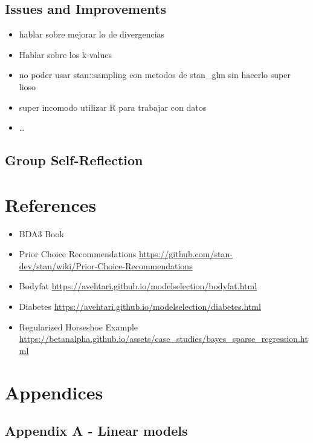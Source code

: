 \documentclass[
]{article}
\providecommand{\tightlist}{%
  \setlength{\itemsep}{0pt}\setlength{\parskip}{0pt}}
\begin{document}
\hypertarget{issues-and-improvements}{%
\subsection{Issues and Improvements}\label{issues-and-improvements}}

\begin{itemize}
\tightlist
\item
  hablar sobre mejorar lo de divergencias
\item
  Hablar sobre los k-values
\item
  no poder usar stan::sampling con metodos de stan\_glm sin hacerlo
  super lioso
\item
  super incomodo utilizar R para trabajar con datos
\item
  \ldots{}
\end{itemize}

\hypertarget{group-self-reflection}{%
\subsection{Group Self-Reflection}\label{group-self-reflection}}

\hypertarget{references}{%
\section{References}\label{references}}

\begin{itemize}
\item
  BDA3 Book
\item
  Prior Choice Recommendations
  \url{https://github.com/stan-dev/stan/wiki/Prior-Choice-Recommendations}
\item
  Bodyfat \url{https://avehtari.github.io/modelselection/bodyfat.html}
\item
  Diabetes \url{https://avehtari.github.io/modelselection/diabetes.html}
\item
  Regularized Horseshoe Example
  \url{https://betanalpha.github.io/assets/case_studies/bayes_sparse_regression.html}
\end{itemize}

\hypertarget{appendices}{%
\section{Appendices}\label{appendices}}

\hypertarget{apa}{%
\subsection{Appendix A - Linear models}\label{apa}}
\end{document}
